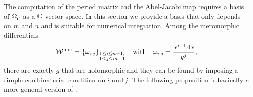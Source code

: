 \documentclass[main.tex]{subfiles}
\begin{document}
    The computation of the period matrix and the Abel-Jacobi map requires a basis of $\Omega^1_{\mathcal{C}}$ as a $\mathbb{C}$-vector space. In this section we provide a basis that only
   depends on $m$ and $n$ and is suitable for numerical integration. \abstand
    Among the meromorphic differentials
    \begin{align*}
 \mathcal{W}^{\text{mer}} = \left\{  \omega_{i,j}   \right\}_{\substack{1 \le i \le n-1, \\ 1 \le j \le m-1}} \quad \text{with} \quad \omega_{i,j} = \frac{x^{i-1}\mathrm d x}{y^j},
  \end{align*}
  there are exactly $g$ that are holomorphic  and they can be found by imposing a simple combinatorial condition on $i$ and $j$.
 The following proposition is basically a more general version of
  \cite[Proposition 2]{CT1996}.

   \bigskip
\end{document}
